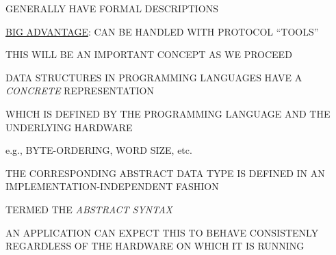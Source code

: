 \begin{bwslide}

\begin{nrtc}
\item	GENERALLY HAVE FORMAL DESCRIPTIONS
\item	\underline{BIG ADVANTAGE}: CAN BE HANDLED WITH PROTOCOL ``TOOLS''
\item	THIS WILL BE AN IMPORTANT CONCEPT AS WE PROCEED
\end{nrtc}
\end{bwslide}


%


\begin{bwslide}

\begin{nrtc}
\item   DATA STRUCTURES IN PROGRAMMING LANGUAGES HAVE A \emph{CONCRETE}
        REPRESENTATION
    \begin{nrtc}
    \item       WHICH IS DEFINED BY THE PROGRAMMING LANGUAGE AND THE
                UNDERLYING HARDWARE

    \item       e.g., BYTE-ORDERING, WORD SIZE, etc.
    \end{nrtc}

\item   THE CORRESPONDING ABSTRACT DATA TYPE IS DEFINED IN AN
        IMPLEMENTATION-INDEPENDENT FASHION
    \begin{nrtc}
    \item       TERMED THE \emph{ABSTRACT SYNTAX}
    \end{nrtc}

\item   AN APPLICATION CAN EXPECT THIS TO BEHAVE CONSISTENLY REGARDLESS OF THE
        HARDWARE ON WHICH IT IS RUNNING
\end{nrtc}
\end{bwslide}


